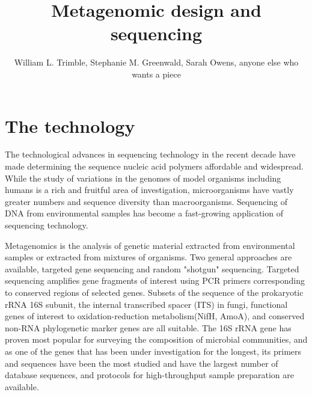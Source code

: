 \documentclass[graybox]{svmult}
\begin{document}
\title*{Metagenomic design and sequencing}
\author{William L. Trimble, Stephanie M. Greenwald, Sarah Owens, anyone else who wants a piece }
%
%
\maketitle



\section{The technology}
\label{sec:1}

The technological advances in sequencing technology in the recent decade have made determining the sequence nucleic acid polymers affordable and widespread.  While the study of variations in the genomes of model organisms including humans is a rich and fruitful area of investigation, microorganisms have vastly greater numbers and sequence diversity than macroorganisms.  Sequencing of DNA from environmental samples has become a fast-growing application of sequencing technology.

Metagenomics is the analysis of genetic material extracted from environmental samples or extracted from mixtures of organisms.  Two general approaches are available, targeted gene sequencing and random "shotgun" sequencing.    Targeted sequencing amplifies gene fragments of interest using PCR primers corresponding to conserved regions of selected genes.   Subsets of the sequence of the prokaryotic  rRNA 16S subunit, the internal transcribed spacer (ITS) in fungi, functional genes of interest to oxidation-reduction metabolism(NifH, AmoA), and conserved non-RNA phylogenetic marker genes are all suitable.  The 16S rRNA gene has proven most popular for surveying the composition of microbial communities, and as one of the genes that has been under investigation for the longest, its primers and sequences have been the most studied and have the largest number of database sequences, and protocols for high-throughput sample preparation are available.\cite{Caporaso2012Ultrahighthroughput}
\end{document}
